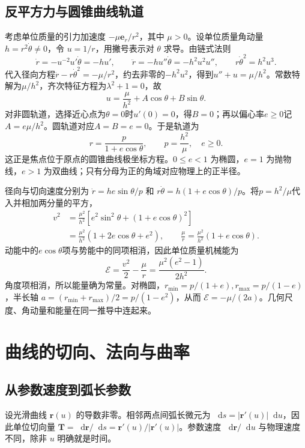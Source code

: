 \documentclass[11pt,openany,fontset=fandol]{ctexbook}
\theoremstyle{plain}\newtheorem{theorem}{定理}[chapter]\newtheorem{proposition}[theorem]{命题}
\theoremstyle{definition}\newtheorem{definition}{定义}[chapter]\newtheorem{example}{例}[chapter]
\theoremstyle{remark}\newtheorem*{remark}{说明}
\newcommand{\dd}{\mathop{}\!\mathrm d}\newcommand{\ii}{\mathrm i}\newcommand{\ee}{\mathrm e}
\newcommand{\vct}[1]{\bm{#1}}\newcommand{\Rea}{\operatorname{Re}}\newcommand{\Ima}{\operatorname{Im}}
\begin{document}
\subsection{反平方力与圆锥曲线轨道}
考虑单位质量的引力加速度 $-\mu\vct e_r/r^2$，其中 $\mu>0$。设单位质量角动量 $h=r^2\dot\theta\ne0$，令 $u=1/r$，用撇号表示对 $\theta$ 求导。由链式法则
\[
\dot r=-u^{-2}u'\dot\theta=-hu',\qquad
\ddot r=-hu''\dot\theta=-h^2u^2u'',\qquad
r\dot\theta^2=h^2u^3.
\]
代入径向方程$\ddot r-r\dot\theta^2=-\mu/r^2$，约去非零的$-h^2u^2$，得到$u''+u=\mu/h^2$。常数特解为$\mu/h^2$，齐次特征方程为$\lambda^2+1=0$，故
\[u=\frac\mu{h^2}+A\cos\theta+B\sin\theta.\]
对非圆轨道，选择近心点为$\theta=0$时$u'(0)=0$，得$B=0$；再以偏心率$e\ge0$记$A=e\mu/h^2$。圆轨道对应$A=B=e=0$。于是轨道为
\begin{equation}
r=\frac p{1+e\cos\theta},\qquad p=\frac{h^2}{\mu},\quad e\ge0.
\end{equation}
这正是焦点位于原点的圆锥曲线极坐标方程。$0\le e<1$ 为椭圆，$e=1$ 为抛物线，$e>1$ 为双曲线；只有分母为正的角域对应物理上的正半径。

径向与切向速度分别为 $\dot r=he\sin\theta/p$ 和 $r\dot\theta=h(1+e\cos\theta)/p$。将$p=h^2/\mu$代入并相加两分量的平方，
\[
\begin{aligned}
v^2&=\frac{\mu^2}{h^2}
\left[e^2\sin^2\theta+(1+e\cos\theta)^2\right]\\
&=\frac{\mu^2}{h^2}(1+2e\cos\theta+e^2),
\qquad \frac\mu r=\frac{\mu^2}{h^2}(1+e\cos\theta).
\end{aligned}
\]
动能中的$e\cos\theta$项与势能中的同项相消，因此单位质量机械能为
\begin{equation}
\mathcal E=\frac{v^2}{2}-\frac\mu r
=\frac{\mu^2(e^2-1)}{2h^2}.
\end{equation}
角度项相消，所以能量确为常量。对椭圆，$r_{\min}=p/(1+e),r_{\max}=p/(1-e)$，半长轴 $a=(r_{\min}+r_{\max})/2=p/(1-e^2)$，从而 $\mathcal E=-\mu/(2a)$。几何尺度、角动量和能量在同一推导中连起来。

\section{曲线的切向、法向与曲率}
\subsection{从参数速度到弧长参数}
设光滑曲线 $\vct r(u)$ 的导数非零。相邻两点间弧长微元为 $\dd s=|\vct r'(u)|\dd u$，因此单位切向量 $\vct T=\dd\vct r/\dd s=\vct r'(u)/|\vct r'(u)|$。参数速度 $\dd\vct r/\dd u$ 与物理速度不同，除非 $u$ 明确就是时间。
\end{document}
